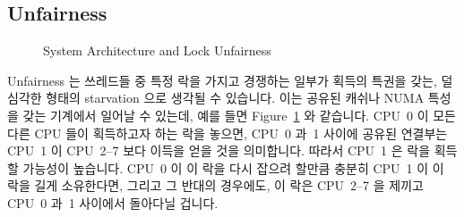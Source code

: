\fi

\subsection{Unfairness}
\label{sec:locking:Unfairness}

\begin{figure}[tb]
\centering
{}
\caption{System Architecture and Lock Unfairness}
\label{fig:locking:System Architecture and Lock Unfairness}
\end{figure}

Unfairness 는 쓰레드들 중 특정 락을 가지고 경쟁하는 일부가 획득의 특권을 갖는,
덜 심각한 형태의 starvation 으로 생각될 수 있습니다.
이는 공유된 캐쉬나 NUMA 특성을 갖는 기계에서 일어날 수 있는데, 예를 들면
Figure~\ref{fig:locking:System Architecture and Lock Unfairness} 와 같습니다.
CPU~0 이 모든 다른 CPU 들이 획득하고자 하는 락을 놓으면, CPU~0 과~1 사이에
공유된 연결부는 CPU~1 이 CPU~2--7 보다 이득을 얻을 것을 의미합니다.
따라서 CPU~1 은 락을 획득할 가능성이 높습니다.
CPU~0 이 이 락을 다시 잡으려 할만큼 충분히 CPU~1 이 이 락을 길게 소유한다면,
그리고 그 반대의 경우에도, 이 락은 CPU~2--7 을 제끼고 CPU~0 과~1 사이에서
돌아다닐 겁니다.

